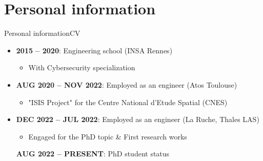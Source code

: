 

\addtocounter{framenumber}{-1}

\section{Personal information}

\begin{frame}{Personal information}{CV}

    \begin{itemize}
        \item \textbf{2015 – 2020}: Engineering school (INSA Rennes)
              \begin{itemize}
                  \item With Cybersecurity specialization
              \end{itemize}
        \item \textbf{AUG 2020 – NOV 2022}: Employed as an engineer (Atos Toulouse)
              \begin{itemize}
                  \item "ISIS Project" for the Centre National d’Etude Spatial (CNES)
              \end{itemize}
        \item \textbf{DEC 2022 – JUL 2022}: Employed as an engineer (La Ruche, Thales LAS)
              \begin{itemize}
                  \item Engaged for the PhD topic \& First research works
              \end{itemize}
              \textbf{AUG 2022 – PRESENT}: PhD student status
    \end{itemize}

\end{frame}

